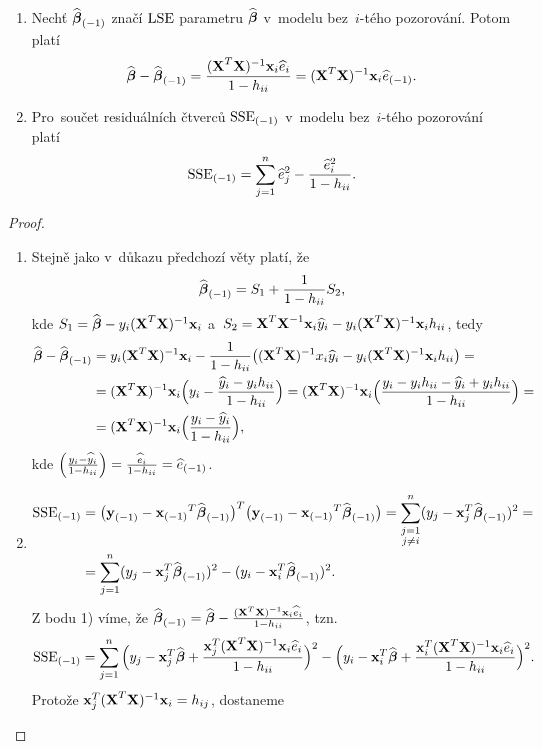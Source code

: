 \begin{theorem}
	\begin{enumerate}[1)]
		\item Nechť ${\widehat{\boldsymbol{\beta}}_{(-1)}}$ značí $\mathrm{LSE}$ parametru $\widehat{\boldsymbol{\beta}}$ v~modelu bez~$i$-tého pozorování. Potom platí
	 $$ \widehat{\boldsymbol{\beta}}-{\widehat{\boldsymbol{\beta}}_{(-1)}} = \frac{(\textbf{X}^T\textbf{X})^{-1}\textbf{x}_i\widehat{e}_i}{1-h_{ii}} = (\textbf{X}^T\textbf{X})^{-1}\textbf{x}_i{\widehat{e}_{(-1)}}. $$
	\item Pro~součet residuálních čtverců ${\mathrm{SSE}_{(-1)}}$ v~modelu bez~$i$-tého pozorování platí
	 $$ {\mathrm{SSE}_{(-1)}} = \sum\limits_{j=1}^{n} \widehat{e}_j^2-\frac{\widehat{e}_i^2}{1-h_{ii}}. $$
	\end{enumerate}

\begin{proof}
	\begin{enumerate}[1)]
		\item Stejně jako v~důkazu předchozí věty platí, že
		 $$ {\widehat{\boldsymbol{\beta}}_{(-1)}} = S_1+\frac{1}{1-h_{ii}}S_2, $$
		kde $S_1 = \widehat{\boldsymbol{\beta}}-y_i{(\textbf{X}^T\textbf{X})^{-1}}\textbf{x}_i$ a~$S_2 = {\textbf{X}^T\textbf{X}^{-1}}\textbf{x}_i\widehat{y}_i-y_i{(\textbf{X}^T\textbf{X})^{-1}} \textbf{x}_ih_{ii}$, tedy
		\[
		\begin{split}
		\widehat{\boldsymbol{\beta}}-{\widehat{\boldsymbol{\beta}}_{(-1)}}& = y_i{(\textbf{X}^T\textbf{X})^{-1}}\textbf{x}_i-\frac{1}{1-h_{ii}}\big({(\textbf{X}^T\textbf{X})^{-1}} x_i\widehat{y}_i-y_i{(\textbf{X}^T\textbf{X})^{-1}} \textbf{x}_ih_{ii}\big) = \\& = {(\textbf{X}^T\textbf{X})^{-1}} \textbf{x}_i\Big(y_i-\frac{\widehat{y}_i-y_ih_{ii}}{1-h_{ii}}\Big) = {(\textbf{X}^T\textbf{X})^{-1}} \textbf{x}_i\Big(\frac{y_i-y_ih_{ii}-\widehat{y}_i+y_ih_{ii}}{1-h_{ii}}\Big) = \\& = {(\textbf{X}^T\textbf{X})^{-1}} \textbf{x}_i\Big(\frac{y_i-\widehat{y}_i}{1-h_{ii}}\Big),
		\end{split}
		\]
		kde $\Big(\frac{y_i-\widehat{y}_i}{1-h_{ii}}\Big) = \frac{\widehat{e}_i}{1-h_{ii}} = {\widehat{e}_{(-1)}}$.
		\item \[
		\begin{split}
		{\mathrm{SSE}_{(-1)}}& = \big({\textbf{y}_{(-1)}}-{\textbf{x}_{(-1)}}^T{\widehat{\boldsymbol{\beta}}_{(-1)}}\big)^T\big({\textbf{y}_{(-1)}}-{\textbf{x}_{(-1)}}^T{\widehat{\boldsymbol{\beta}}_{(-1)}}\big) = \sum_{\substack{j = 1\\j\neq i}}^n(y_j-\textbf{x}_j^T{\widehat{\boldsymbol{\beta}}_{(-1)}})^2 = \\& = \sum\limits_{j=1}^{n} (y_j-\textbf{x}_j^T{\widehat{\boldsymbol{\beta}}_{(-1)}})^2-(y_i-\textbf{x}_i^T{\widehat{\boldsymbol{\beta}}_{(-1)}})^2.
		\end{split}
		\]
		Z bodu 1) víme, že ${\widehat{\boldsymbol{\beta}}_{(-1)}} = \widehat{\boldsymbol{\beta}}-\frac{{(\textbf{X}^T\textbf{X})^{-1}} \textbf{x}_i\widehat{e}_i}{1-h_{ii}}$, tzn.
		 $$ {\mathrm{SSE}_{(-1)}} = \sum\limits_{j=1}^{n}\Big(y_j-\textbf{x}_j^T\widehat{\boldsymbol{\beta}}+\frac{\textbf{x}_j^T{(\textbf{X}^T\textbf{X})^{-1}} \textbf{x}_i\widehat{e}_i}{1-h_{ii}}\Big)^2-\Big(y_i-\textbf{x}_i^T\widehat{\boldsymbol{\beta}}+\frac{\textbf{x}_i^T{(\textbf{X}^T\textbf{X})^{-1}} \textbf{x}_i\widehat{e}_i}{1-h_{ii}}\Big)^2. $$
		Protože $\textbf{x}_j^T{(\textbf{X}^T\textbf{X})^{-1}} \textbf{x}_i = h_{ij}$, dostaneme

\end{enumerate}
\end{proof}
\end{theorem}
